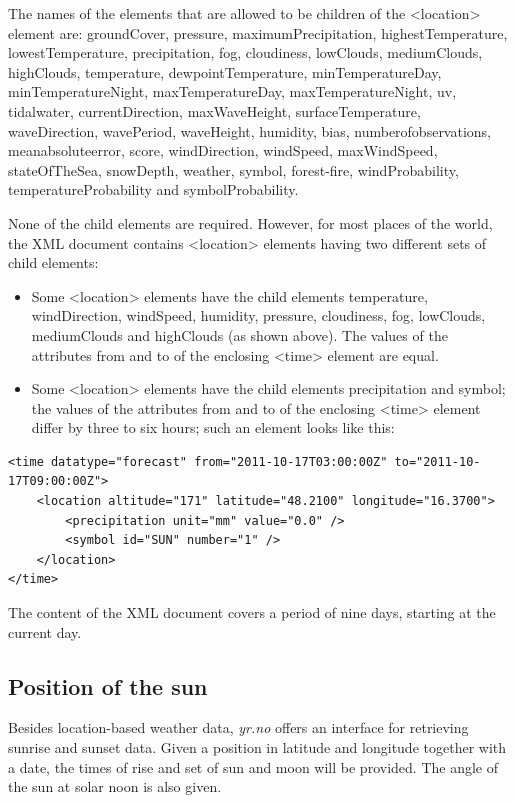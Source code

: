 The names of the elements that are allowed to be children of the <location> element are: groundCover, pressure, maximumPrecipitation, highestTemperature, lowestTemperature, precipitation, fog, cloudiness, lowClouds, mediumClouds, highClouds, temperature, dewpointTemperature, minTemperatureDay, minTemperatureNight, maxTemperatureDay, maxTemperatureNight, uv, tidalwater, currentDirection, maxWaveHeight, surfaceTemperature, waveDirection, wavePeriod, waveHeight, humidity, bias, numberofobservations, meanabsoluteerror, score, windDirection, windSpeed, maxWindSpeed, stateOfTheSea, snowDepth, weather, symbol, forest-fire, windProbability, temperatureProbability and symbolProbability.

None of the child elements are required. However, for most places of the world, the XML document contains <location> elements having two different sets of child elements:

\begin{itemize}
  \item Some <location> elements have the child elements temperature, windDirection, windSpeed, humidity, pressure, cloudiness, fog, lowClouds, mediumClouds and highClouds (as shown above). The values of the attributes from and to of the enclosing <time> element are equal.
  \item Some <location> elements have the child elements precipitation and symbol; the values of the attributes from and to of the enclosing <time> element differ by three to six hours; such an element looks like this:
\end{itemize}

\begin{lstlisting}
<time datatype="forecast" from="2011-10-17T03:00:00Z" to="2011-10-17T09:00:00Z">
	<location altitude="171" latitude="48.2100" longitude="16.3700">
		<precipitation unit="mm" value="0.0" />
		<symbol id="SUN" number="1" />
	</location>
</time>
\end{lstlisting}

The content of the XML document covers a period of nine days, starting at the current day.

\subsection{Position of the sun}
\label{subsec:sun_position}

Besides location-based weather data, \emph{yr.no} offers an interface for retrieving sunrise and sunset data. Given a position in latitude and longitude together with a date, the times of rise and set of sun and moon will be provided. The angle of the sun at solar noon is also given.


